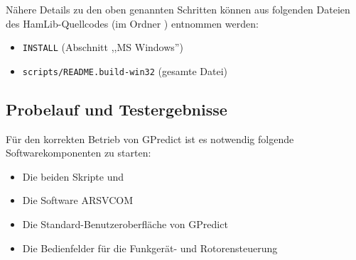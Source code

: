 Nähere Details zu den oben genannten Schritten können aus folgenden Dateien des HamLib-Quellcodes (im Ordner ) entnommen werden:

\begin{itemize}
	\parskip0pt
	\item \texttt{INSTALL} (Abschnitt ,,MS Windows'')
	\item \texttt{scripts/README.build-win32} (gesamte Datei)
\end{itemize}

\subsection{Probelauf und Testergebnisse}
\label{chap:probelauf}

Für den korrekten Betrieb von GPredict ist es notwendig folgende Softwarekomponenten zu starten:

\begin{itemize}
	\parskip0pt
	\item Die beiden Skripte  und 
	\item Die Software ARSVCOM
	\item Die Standard-Benutzeroberfläche von GPredict
	\item Die Bedienfelder für die Funkgerät- und Rotorensteuerung
\end{itemize}

